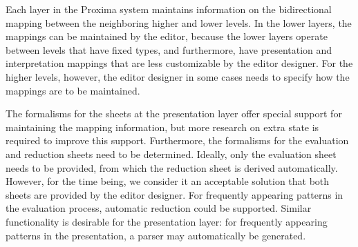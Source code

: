 Each layer in the Proxima system maintains information on the bidirectional mapping between the neighboring higher and lower levels. In the lower layers, the mappings can be maintained by the editor, because the lower layers operate between levels that have fixed types, and furthermore, have presentation and interpretation mappings that are less customizable by the editor designer. For the higher levels, however, the editor designer in some cases needs to specify how the mappings are to be maintained. 

The formalisms for the sheets at the presentation layer offer special support for maintaining the mapping information, but more research \bc on extra state \ec is required to improve this support. Furthermore, the formalisms for the evaluation and reduction sheets need to be determined. Ideally, only the evaluation sheet needs to be provided, from which the reduction sheet is derived automatically. However, for the time being, we consider it an acceptable solution that both sheets are provided by the editor designer. For frequently appearing patterns in the evaluation process, automatic reduction could be supported. Similar functionality is desirable for the presentation layer: for frequently appearing patterns in the presentation, a parser may automatically be generated.
 

